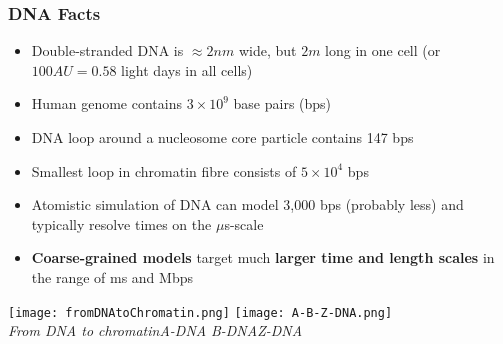 \documentclass[slidestop,compress,9pt]{beamer}
\begin{document}
\begin{frame}
\frametitle{DNA Facts}

\begin{itemize}
\item Double-stranded DNA is $\approx 2 nm$ wide, but $2m$ long in one cell (or $100 AU = 0.58$ light days in all cells)
\item Human genome contains $3\times10^{9}$ base pairs (bps)
\item DNA loop around a nucleosome core particle contains 147 bps
\item Smallest loop in chromatin fibre consists of $5\times10^4$ bps
\item Atomistic simulation of DNA can model 3,000 bps (probably less) and typically resolve times on the $\mu$s-scale  
\item \textbf{Coarse-grained models} target much \textbf{larger time and length scales} in the range of ms and Mbps 
\end{itemize}

\vspace*{-0.25cm}
\begin{center}
\texttt{[image: fromDNAtoChromatin.png]}
\texttt{[image: A-B-Z-DNA.png]}\\
\textit{From DNA to chromatin}\hspace{3.2cm}\textit{A-DNA}\hspace{0.9cm} \textit{B-DNA}\hspace{0.9cm}\textit{Z-DNA}
\end{center}

\end{frame}
\end{document}
